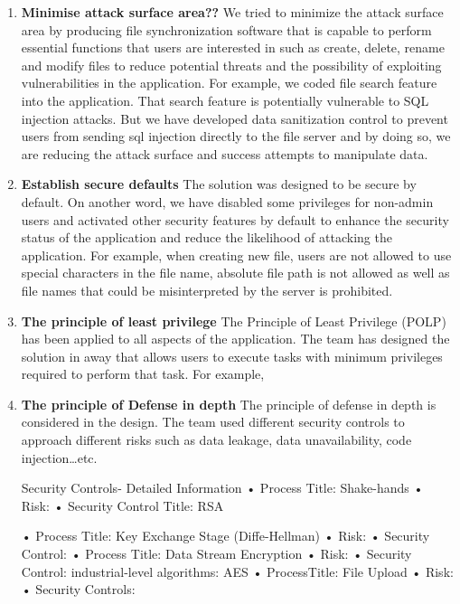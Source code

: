 \documentclass{article}
\begin{document}
\begin{enumerate}
\item \textbf{Minimise attack surface area??}
We tried to minimize the attack surface area by producing file synchronization software that is capable to perform essential functions that users are interested in  such as create, delete, rename and modify files to reduce potential threats and the possibility of exploiting vulnerabilities in the application.
For example, we coded file search feature into the application. That search feature is potentially vulnerable to SQL injection attacks. But we have developed data sanitization control to prevent users from sending sql injection directly to the file server and by doing so, we are reducing the attack surface and success attempts to manipulate data.
\item \textbf{Establish secure defaults}
The solution was designed to be secure by default. On another word, we have disabled some privileges for non-admin users and activated other security features by default to enhance the security status of the application and reduce the likelihood of attacking the application. For example, when creating new file, users are not allowed to use special characters in the file name, absolute file path is not allowed as well as file names that could be misinterpreted by the server is prohibited.
\item \textbf{The principle of least privilege}
The Principle of Least Privilege (POLP) has been applied to all aspects of the application. The team has designed the solution in away that allows users to execute tasks with minimum privileges required to perform that task.
For example,
\item \textbf{The principle of Defense in depth}
The principle of defense in depth is considered in the design. The team used different security controls to approach different risks such as data leakage, data unavailability, code injection…etc.

Security Controls- Detailed Information
•	Process Title: Shake-hands
•	Risk:
•	Security Control Title: RSA

•	Process Title: Key Exchange Stage (Diffe-Hellman)
•	Risk:
•	Security Control:
•	Process Title: Data Stream Encryption
•	Risk:
•	Security Control: industrial-level algorithms: AES
•	ProcessTitle: File Upload
•	Risk:
•	Security Controls:


\end{enumerate}
\end{document}
